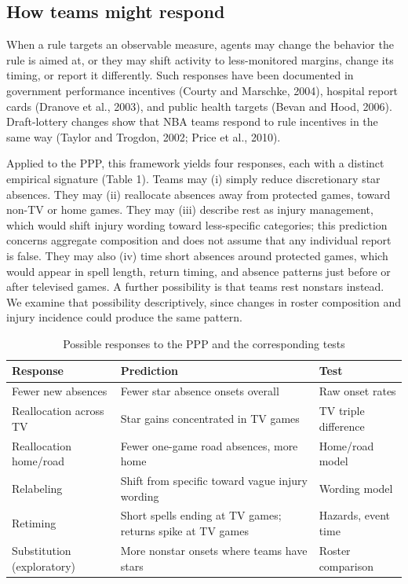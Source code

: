 \documentclass[11pt]{article}
\begin{document}
\subsection{How teams might respond}

When a rule targets an observable measure, agents may change the behavior the rule is aimed at, or they may shift activity to less-monitored margins, change its timing, or report it differently. Such responses have been documented in government performance incentives (Courty and Marschke, 2004), hospital report cards (Dranove et al., 2003), and public health targets (Bevan and Hood, 2006). Draft-lottery changes show that NBA teams respond to rule incentives in the same way (Taylor and Trogdon, 2002; Price et al., 2010).

Applied to the PPP, this framework yields four responses, each with a distinct empirical signature (Table 1). Teams may (i) simply reduce discretionary star absences. They may (ii) reallocate absences away from protected games, toward non-TV or home games. They may (iii) describe rest as injury management, which would shift injury wording toward less-specific categories; this prediction concerns aggregate composition and does not assume that any individual report is false. They may also (iv) time short absences around protected games, which would appear in spell length, return timing, and absence patterns just before or after televised games. A further possibility is that teams rest nonstars instead. We examine that possibility descriptively, since changes in roster composition and injury incidence could produce the same pattern.

\begin{table}[!htbp]\centering\caption{Possible responses to the PPP and the corresponding tests}
\small\begin{tabularx}{\linewidth}{@{}lXl@{}}\toprule
Response & Prediction & Test\\\midrule
Fewer new absences & Fewer star absence onsets overall & Raw onset rates\\
Reallocation across TV & Star gains concentrated in TV games & TV triple difference\\
Reallocation home/road & Fewer one-game road absences, more home & Home/road model\\
Relabeling & Shift from specific toward vague injury wording & Wording model\\
Retiming & Short spells ending at TV games; returns spike at TV games & Hazards, event time\\
Substitution (exploratory) & More nonstar onsets where teams have stars & Roster comparison\\\bottomrule
\end{tabularx}\end{table}
\end{document}
